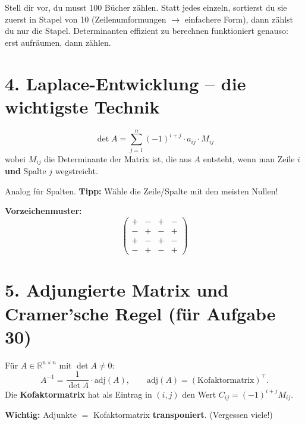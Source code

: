 \documentclass[a4paper,12pt]{article}
\begin{document}
\begin{analogie}
Stell dir vor, du musst 100 B\"ucher z\"ahlen. Statt jedes einzeln, sortierst du sie zuerst in Stapel von 10 (Zeilenumformungen $\to$ einfachere Form), dann z\"ahlst du nur die Stapel. Determinanten effizient zu berechnen funktioniert genauso: erst aufr\"aumen, dann z\"ahlen.
\end{analogie}

\section*{4. Laplace-Entwicklung -- die wichtigste Technik}

\begin{merkbox}[title={Laplace-Entwicklung nach Zeile $i$}]
\[
\det A = \sum_{j=1}^n (-1)^{i+j} \cdot a_{ij} \cdot M_{ij}
\]
wobei $M_{ij}$ die Determinante der Matrix ist, die aus $A$ entsteht, wenn man Zeile $i$ \textbf{und} Spalte $j$ wegstreicht.

\medskip
Analog f\"ur Spalten. \textbf{Tipp:} W\"ahle die Zeile/Spalte mit den meisten Nullen!

\medskip
\textbf{Vorzeichenmuster:}
\[
\begin{pmatrix} + & - & + & - \\ - & + & - & + \\ + & - & + & - \\ - & + & - & + \end{pmatrix}
\]
\end{merkbox}

\section*{5. Adjungierte Matrix und Cramer'sche Regel (f\"ur Aufgabe 30)}

\begin{merkbox}[title={Adjunkte und Inverse}]
F\"ur $A \in \mathbb{R}^{n\times n}$ mit $\det A \neq 0$:
\[
A^{-1} = \frac{1}{\det A} \cdot \text{adj}(A), \qquad \text{adj}(A) = (\text{Kofaktormatrix})^\top.
\]
Die \textbf{Kofaktormatrix} hat als Eintrag in $(i,j)$ den Wert $C_{ij} = (-1)^{i+j} M_{ij}$.

\medskip
\textbf{Wichtig:} Adjunkte $=$ Kofaktormatrix \textbf{transponiert}. (Vergessen viele!)
\end{merkbox}
\end{document}
